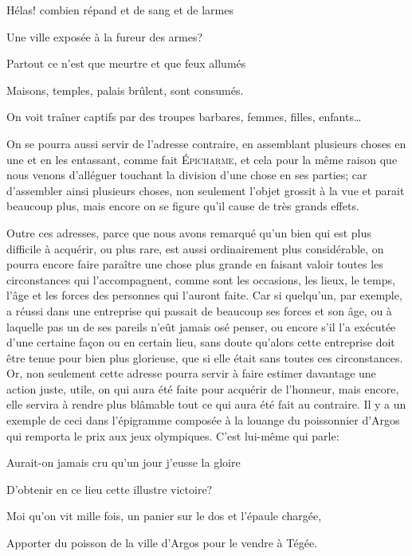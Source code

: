 \begin{emphpar}
  Hélas! combien répand et de sang et de larmes

  Une ville exposée à la fureur des armes?

  Partout ce n'est que meurtre et que feux allumés

  Maisons, temples, palais brûlent, sont consumés.

  On voit traîner captifs par des troupes barbares, femmes, filles, enfants\dots
\end{emphpar}

\bigbreak

On se pourra aussi servir de l'adresse contraire, en assemblant plusieurs choses en une et en les entassant, comme fait
\textsc{Épicharme}, et cela pour la même raison que nous venons d'alléguer touchant la division d'une chose en ses
parties; car d'assembler ainsi plusieurs choses, non seulement l'objet grossit à la vue et parait beaucoup plus, mais
encore on se figure qu'il cause de très grands effets. 

\bigbreak

Outre ces adresses, parce que nous avons remarqué qu'un bien qui est plus difficile à acquérir, ou plus rare, est aussi
ordinairement plus considérable, on pourra encore faire paraître une chose plus grande en faisant valoir toutes les circonstances
qui l’accompagnent, comme sont les occasions, les lieux, le temps, l'âge et les forces des personnes qui l'auront faite. Car
si quelqu'un, par exemple, a réussi dans une entreprise qui passait de beaucoup ses forces et son âge, ou à laquelle pas un
de ses pareils n'eût jamais osé penser, ou encore s'il l'a exécutée d'une certaine façon ou en certain lieu, sans doute
qu'alors cette entreprise doit être tenue pour bien plus glorieuse, que si elle était sans toutes ces circonstances. Or, non
seulement cette adresse pourra servir à faire estimer davantage une action juste, utile, on qui aura été faite pour acquérir
de l'honneur, mais encore, elle servira à rendre plus blâmable tout ce qui aura été fait au contraire. Il y a un exemple de
ceci dans l'épigramme composée à la louange du poissonnier d'Argos qui remporta le prix aux jeux olympiques. C'est lui-même
qui parle:

\begin{emphpar}
  Aurait-on jamais cru qu'un jour j'eusse la gloire

  D'obtenir en ce lieu cette illustre victoire?

  Moi qu'on vit mille fois, un panier sur le dos et l'épaule chargée,

  Apporter du poisson de la ville d'Argos pour le vendre à Tégée.
\end{emphpar}

